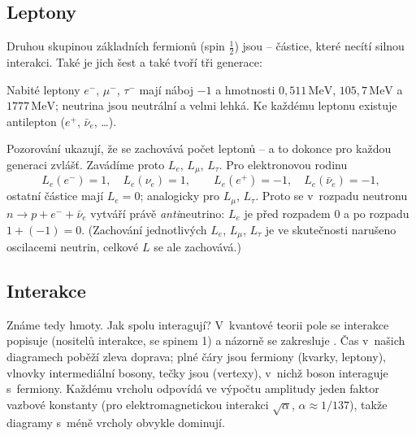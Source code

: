 \subsection{Leptony}

Druhou skupinou základních fermionů (spin $\tfrac12$) jsou  -- částice, které necítí silnou interakci. Také je jich šest a také tvoří tři generace:
\begin{center}
\end{center}
Nabité leptony $e^-$, $\mu^-$, $\tau^-$ mají náboj $-1$ a hmotnosti $0{,}511\,\mathrm{MeV}$, $105{,}7\,\mathrm{MeV}$ a $1777\,\mathrm{MeV}$; neutrina jsou neutrální a velmi lehká. Ke každému leptonu existuje antilepton ($e^+$, $\bar\nu_e$, \dots).

Pozorování ukazují, že se zachovává počet leptonů -- a to dokonce pro každou generaci zvlášť. Zavádíme proto  $L_e$, $L_\mu$, $L_\tau$. Pro elektronovou rodinu
\begin{equation}
  L_e(e^-) = 1, \quad L_e(\nu_e) = 1, \qquad L_e(e^+) = -1, \quad L_e(\bar\nu_e) = -1,
\end{equation}
ostatní částice mají $L_e=0$; analogicky pro $L_\mu$, $L_\tau$. Proto se v~rozpadu neutronu $n\to p+e^-+\bar\nu_e$ vytváří právě \emph{anti}neutrino: $L_e$ je před rozpadem $0$ a po rozpadu $1+(-1)=0$. (Zachování jednotlivých $L_e$, $L_\mu$, $L_\tau$ je ve skutečnosti narušeno oscilacemi neutrin, celkové $L$ se ale zachovává.)

\subsection{Interakce}

Známe tedy  hmoty. Jak spolu interagují? V~kvantové teorii pole se interakce popisuje  (nositelů interakce, se spinem 1) a názorně se zakresluje . Čas v~našich diagramech poběží zleva doprava; plné čáry jsou fermiony (kvarky, leptony), vlnovky intermediální bosony, tečky jsou  (vertexy), v~nichž boson interaguje s~fermiony. Každému vrcholu odpovídá ve výpočtu amplitudy jeden faktor vazbové konstanty (pro elektromagnetickou interakci $\sqrt{\alpha}$, $\alpha\approx1/137$), takže diagramy s~méně vrcholy obvykle dominují.

